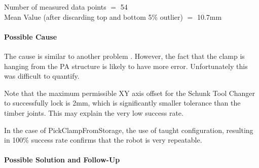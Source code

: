 {\footnotesize Number of measured data points $=$ 54 \\ Mean Value (after discarding top and bottom 5\% outlier) $=$ 10.7mm}

\paragraph{Possible Cause}

The cause is similar to another problem . However, the fact that the clamp is hanging from the PA structure is likely to have more error. Unfortunately this was difficult to quantify. 

Note that the maximum permissible XY axis offset for the Schunk Tool Changer to successfully lock is 2mm, which is significantly smaller tolerance than the timber joints. This may explain the very low success rate.

In the case of PickClampFromStorage, the use of taught configuration, resulting in 100\% success rate confirms that the robot is very repeatable. 

\paragraph{Possible Solution and Follow-Up}

